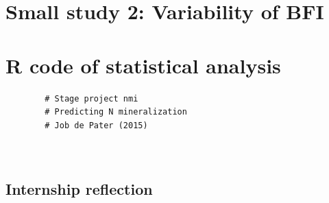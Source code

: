 \documentclass[10pt,twoside,dutch,english]{report}
\begin{document}
\begin{appendices}
\chapter{Small study 2: Variability of BFI}
		\label{chap:study2}
		
		
		\chapter{R code of statistical analysis} %
		\begin{verbatim}
		# Stage project nmi
		# Predicting N mineralization
		# Job de Pater (2015)
		
		
		\end{verbatim}
\section{Internship reflection}
\end{appendices}



    
\end{document}
